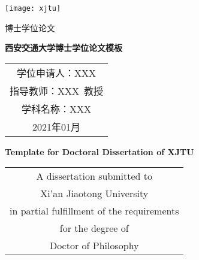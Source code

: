 
\begin{titlepage}
	\begin{center}
		\begin{figure*}[!ht]\vspace{4.5em}
			\centering
			\texttt{[image: xjtu]}
		\end{figure*}
		
		\vspace{1.5em}
		\begin{center} { 博士学位论文} \end{center}
		
		\vspace{8.5em}
		\begin{center} {\sanhao\bfseries{西安交通大学博士学位论文模板}}\end{center}
		
		\vspace{16em}
		{\sanhao
			\begin{center} \renewcommand{\arraystretch}{1.8}
				\begin{tabular}{c}
					学位申请人：XXX \\
					指导教师：XXX\,\,\,教授 \\
					学科名称：XXX \\
					2021年01月 \\
				\end{tabular} \renewcommand{\arraystretch}{1}
			\end{center}
		}
	\end{center}
	\clearpage{\pagestyle{empty}\cleardoublepage}
	
	\newpage\thispagestyle{empty}
	\begin{center}
		\parbox[t][0.4cm][t]{\textwidth}{}
		
		\begin{center}{\sanhao\bfseries {} Template for Doctoral Dissertation of XJTU}\end{center}
		
		\vspace{4.1cm}
		{\sanhao
			\begin{center} \renewcommand{\arraystretch}{1.35}
				\begin{tabular}{c}
					A dissertation submitted to  \\
					Xi'an Jiaotong University \\
					in partial fulfillment of the requirements \\
					for the degree of \\
					Doctor of Philosophy \\
				\end{tabular} \renewcommand{\arraystretch}{1}
			\end{center}
		}
		

\end{center}
\end{titlepage}
